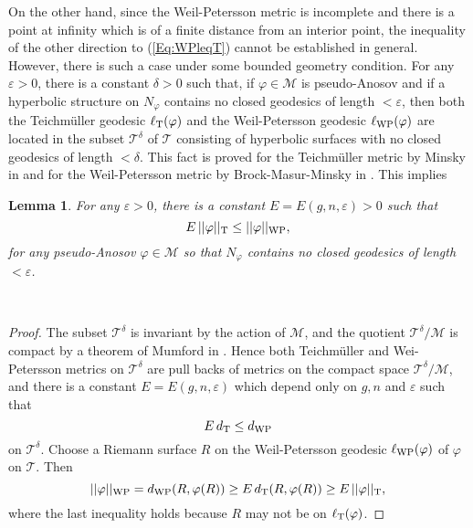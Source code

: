 \documentclass[11pt,reqno]{amsart}
\newtheorem{lemma}[theorem]{{\bf Lemma}}
\numberwithin{equation}{section}
\begin{document}
On the other hand, 
since the Weil-Petersson metric is incomplete and 
there is a point at infinity which is of a finite distance from an interior point, 
the inequality of the other direction to   (\ref{Eq:WPleqT})  cannot be 
established in general.  
However, 
there is such a case under some bounded geometry condition.  
For any  $\varepsilon > 0$, 
there is a constant  $\delta > 0$  such that,  
if  $\varphi \in \mathcal{M}$  is pseudo-Anosov and 
if a hyperbolic structure on  $N_{\varphi}$  contains 
no closed geodesics of length $< \varepsilon$, 
then both the Teichm\"uller geodesic  $\ell_{{\rm T}}(\varphi)$  and 
the Weil-Petersson geodesic  $\ell_{{\rm WP}}(\varphi)$  are located 
in the subset  $\mathcal{T}^{\delta}$  of  $\mathcal{T}$  consisting of 
hyperbolic surfaces with no closed geodesics of 
length $< \delta$.  
This fact is proved for the Teichm\"uller metric by Minsky in  \cite{Minsky}  and 
for the Weil-Petersson metric by Brock-Masur-Minsky in  \cite{BMM}. 
This implies 

\begin{lemma}\label{Lem:TleqWP}
For any  $\varepsilon > 0$, 
there is a constant  $E = E(g,n, \varepsilon) > 0$  such that
\begin{equation}\label{Eq:TleqWP}
	E \, || \varphi ||_{{\rm T}} \leq || \varphi ||_{{\rm WP}}, 
\end{equation}
for any pseudo-Anosov $\varphi \in \mathcal{M}$  so that  
$N_{\varphi}$  contains no closed geodesics of length  $< \varepsilon$.  
\end{lemma}\
\begin{proof} 
The subset  $\mathcal{T}^{\delta}$ is invariant by the action of  $\mathcal{M}$, 
and the quotient  $\mathcal{T}^{\delta}/\mathcal{M}$  is 
compact by a theorem of Mumford in \cite{Mumford}.  
Hence  both Teichm\"uller and Wei-Petersson metrics on  $\mathcal{T}^{\delta}$  
are pull backs of metrics on the compact space  $\mathcal{T}^{\delta}/\mathcal{M}$, 
and there is a constant  $E = E(g, n, \varepsilon)$  
which depend only on  $g, n$  and  $\varepsilon$  
such that 
\begin{equation*}
	E \, d_{{\rm T}} \leq d_{{\rm WP}}
\end{equation*} 
on  $\mathcal{T}^{\delta}$.  
Choose a Riemann surface  $R$  on the Weil-Petersson geodesic  
$\ell_{{\rm WP}}(\varphi)$  of  $\varphi$  
on  $\mathcal{T}$.  
Then 
\begin{equation*}
	|| \varphi ||_{{\rm WP}} 
	= d_{{\rm WP}}(R, \varphi(R)) 
	\geq E \, d_{{\rm T}}(R, \varphi(R)) 
	\geq E \, || \varphi ||_{{\rm T}}, 
\end{equation*}
where the last inequality holds because   
$R$  may not be on  $\ell_{{\rm T}}(\varphi)$.   
\end{proof}
\end{document}
